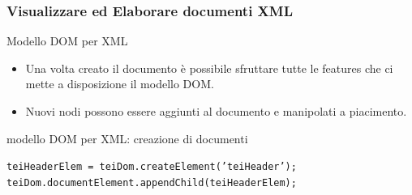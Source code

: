 \begin{frame}
    \frametitle{Visualizzare ed Elaborare documenti XML}
    \addtocounter{nframe}{1}
    

     \begin{block}{Modello DOM per XML}
        \begin{itemize}
            \item Una volta creato il documento è possibile sfruttare tutte le features che ci mette a disposizione il modello DOM.
            \item Nuovi nodi possono essere aggiunti al documento e manipolati a piacimento.
        \end{itemize}
        
     \end{block}

     \begin{block}{modello DOM per XML: creazione di documenti}
       
       \texttt{teiHeaderElem = teiDom.createElement('teiHeader'); }
       \\\texttt{teiDom.documentElement.appendChild(teiHeaderElem);}
       
     \end{block}
     
\end{frame}



